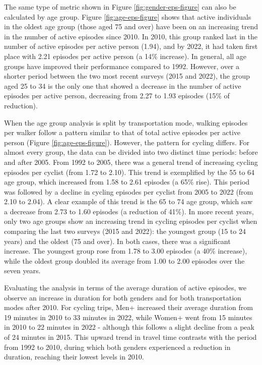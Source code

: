 \documentclass[preprint, 3p,
authoryear]{elsarticle} %
\begin{document}
The same type of metric shown in Figure \ref{fig:gender-eps-figure} can
also be calculated by age group. Figure \ref{fig:age-eps-figure} shows
that active individuals in the oldest age group (those aged 75 and over)
have been on an increasing trend in the number of active episodes since
2010. In 2010, this group ranked last in the number of active episodes
per active person (1.94), and by 2022, it had taken first place with
2.21 episodes per active person (a 14\% increase). In general, all age
groups have improved their performance compared to 1992. However, over a
shorter period between the two most recent surveys (2015 and 2022), the
group aged 25 to 34 is the only one that showed a decrease in the number
of active episodes per active person, decreasing from 2.27 to 1.93
episodes (15\% of reduction).

When the age group analysis is split by transportation mode, walking
episodes per walker follow a pattern similar to that of total active
episodes per active person (Figure \ref{fig:age-eps-figure}). However,
the pattern for cycling differs. For almost every group, the data can be
divided into two distinct time periods: before and after 2005. From 1992
to 2005, there was a general trend of increasing cycling episodes per
cyclist (from 1.72 to 2.10). This trend is exemplified by the 55 to 64
age group, which increased from 1.58 to 2.61 episodes (a 65\% rise).
This period was followed by a decline in cycling episodes per cyclist
from 2005 to 2022 (from 2.10 to 2.04). A clear example of this trend is
the 65 to 74 age group, which saw a decrease from 2.73 to 1.60 episodes
(a reduction of 41\%). In more recent years, only two age groups show an
increasing trend in cycling episodes per cyclist when comparing the last
two surveys (2015 and 2022): the youngest group (15 to 24 years) and the
oldest (75 and over). In both cases, there was a significant increase.
The youngest group rose from 1.78 to 3.00 episodes (a 40\% increase),
while the oldest group doubled its average from 1.00 to 2.00 episodes
over the seven years.

Evaluating the analysis in terms of the average duration of active
episodes, we observe an increase in duration for both genders and for
both transportation modes after 2010. For cycling trips, Men+ increased
their average duration from 19 minutes in 2010 to 33 minutes in 2022,
while Women+ went from 15 minutes in 2010 to 22 minutes in 2022 -
although this follows a slight decline from a peak of 24 minutes in
2015. This upward trend in travel time contrasts with the period from
1992 to 2010, during which both genders experienced a reduction in
duration, reaching their lowest levels in 2010.
\end{document}
